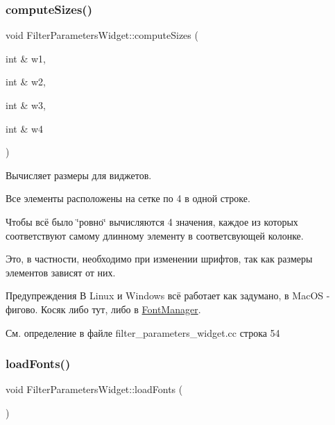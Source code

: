 \subsubsection{\texorpdfstring{compute\+Sizes()}{computeSizes()}}
{\footnotesize\ttfamily void Filter\+Parameters\+Widget\+::compute\+Sizes (\begin{DoxyParamCaption}\item[{int \&}]{w1,  }\item[{int \&}]{w2,  }\item[{int \&}]{w3,  }\item[{int \&}]{w4 }\end{DoxyParamCaption})\hspace{0.3cm}{\ttfamily [private]}}



Вычисляет размеры для виджетов. 

Все элементы расположены на сетке по 4 в одной строке.

Чтобы всё было \char`\"{}ровно\char`\"{} вычисляются 4 значения, каждое из которых соответствуют самому длинному элементу в соответсвующей колонке.

Это, в частности, необходимо при изменении шрифтов, так как размеры элементов зависят от них.

\begin{DoxyWarning}{Предупреждения}
В Linux и Windows всё работает как задумано, в Mac\+OS -\/ фигово. Косяк либо тут, либо в \hyperlink{class_font_manager}{Font\+Manager}. 
\end{DoxyWarning}


См. определение в файле filter\+\_\+parameters\+\_\+widget.\+cc строка 54

\hypertarget{class_filter_parameters_widget_aeadea883731fe8ef61b3577319578e02}{}\label{class_filter_parameters_widget_aeadea883731fe8ef61b3577319578e02} 
\subsubsection{\texorpdfstring{load\+Fonts()}{loadFonts()}}
{\footnotesize\ttfamily void Filter\+Parameters\+Widget\+::load\+Fonts (\begin{DoxyParamCaption}{ }\end{DoxyParamCaption})\hspace{0.3cm}{\ttfamily [private]}}



